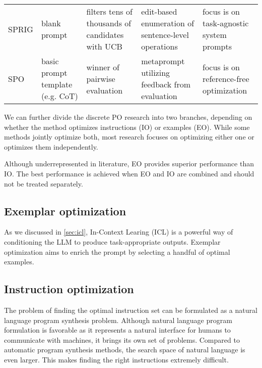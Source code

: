 \begin{landscape}
\begin{table}[htbp]
\begin{tabularx}{\linewidth}{@{}l Y Y Y Y@{}}
SPRIG\cite{zhang2024sprigimprovinglargelanguage} & blank prompt & filters tens of thousands of candidates with UCB & edit-based enumeration of sentence-level operations & focus is on task-agnostic system prompts \\
SPO\cite{xiang2025selfsupervisedpromptoptimization} & basic prompt template (e.g. CoT) & winner of pairwise evaluation & metaprompt utilizing feedback from evaluation & focus is on reference-free optimization\\
\bottomrule
\end{tabularx}
\end{table}
\end{landscape}

We can further divide the discrete PO research into two branches, depending on whether 
the method optimizes instructions (IO) or examples (EO). While some methods jointly optimize both, most
research focuses on optimizing either one or optimizes them independently. 

Although underrepresented in literature, EO provides superior performance than IO\cite{opsahlong2024optimizinginstructionsdemonstrationsmultistage}\cite{wan2024teachbettersmarterinstructions}.
The best performance is achieved when EO and IO are combined and should not be treated separately.

\subsection{Exemplar optimization}

As we discussed in \ref{sec:icl}, In-Context Learing (ICL) is a powerful way of conditioning the LLM to produce
task-appropriate outputs. Exemplar optimization aims to enrich the prompt by selecting a handful of optimal examples.



\subsection{Instruction optimization}
The problem of finding the optimal instruction set can be formulated as a natural language program synthesis problem\cite{zhou2023largelanguagemodelshumanlevel}.
Although natural language program formulation is favorable as it represents a 
natural interface for humans to communicate with machines, it brings its own set of problems.
Compared to automatic program synthesis methods, the search space of natural language is even larger. 
This makes finding the right instructions extremely difficult. 

